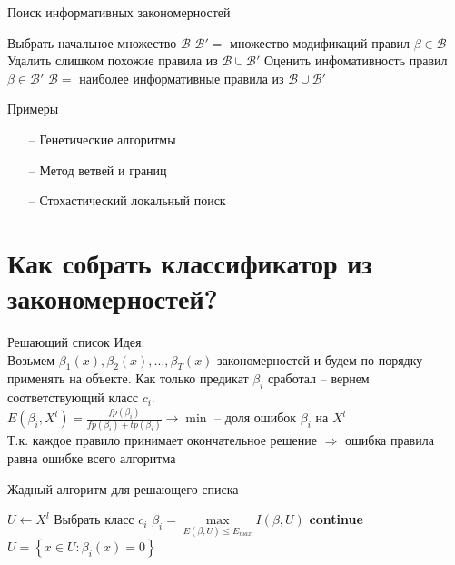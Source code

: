 \documentclass[10pt]{beamer}
\begin{document}
\begin{frame}{Поиск информативных закономерностей}
  \begin{algorithmic}[1]
    \State Выбрать начальное множество $\mathcal{B}$
      \State $\mathcal{B}'=$ множество модификаций правил $\beta \in \mathcal{B}$
      \State Удалить слишком похожие правила из $\mathcal{B} \cup \mathcal{B}'$
      \State Оценить инфомативность правил $\beta \in \mathcal{B}'$
      \State $\mathcal{B}=$ наиболее информативные правила из $\mathcal{B} \cup \mathcal{B}'$
    \EndRepeat
  \EndFunction
  \end{algorithmic}    
\end{frame}

\begin{frame}{Примеры}
	\begin{enumerate}[<+- |alert@+>]
		\item[--] Генетические алгоритмы
		\item[--] Метод ветвей и границ	
		\item[--] Стохастический локальный поиск	
	\end{enumerate}
\end{frame}

\section{Как собрать классификатор из закономерностей?}

\begin{frame}{Решающий список}
	\alert{Идея}:\\
	Возьмем $\beta_1(x), \beta_2(x), \dots, \beta_T(x)$ закономерностей и будем по порядку применять на объекте. 
	Как только предикат $\beta_i$ сработал -- вернем соответствующий класс $c_i$.\\
	\bigbreak
	\pause
	$E(\beta_i, X^l) = \frac{fp(\beta_i)}{fp(\beta_i)+tp(\beta_i)} \rightarrow \min$ -- доля ошибок $\beta_i$ на $X^l$\\
	\bigbreak
	Т.к. каждое правило принимает окончательное решение $\Rightarrow$ ошибка правила равна ошибке всего алгоритма
\end{frame}

\begin{frame}{Жадный алгоритм для решающего списка}
  \begin{algorithmic}[1]
      \State $U \gets X^l$
	      \State Выбрать класс $c_i$
	      \State $\beta_i = \max\limits_{E(\beta, U) \leq E_{max}} I(\beta, U)$
	        \State \textbf{continue}
	      \EndIf
	      \State $U = \left\{ x \in U: \beta_i(x) = 0 \right\}$
	        \Return
	      \EndIf
      \EndFor
    \EndFunction
  \end{algorithmic}    
\end{frame}
\end{document}
